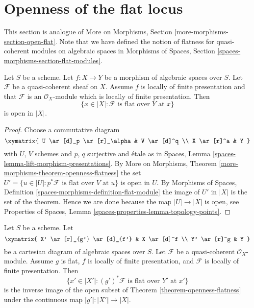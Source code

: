 \section{Openness of the flat locus}
\label{section-open-flat}

\noindent
This section is analogue of
More on Morphisms, Section \ref{more-morphisms-section-open-flat}.
Note that we have defined the notion of flatness for quasi-coherent
modules on algebraic spaces in
Morphisms of Spaces, Section \ref{spaces-morphisms-section-flat-modules}.

\begin{theorem}
\label{theorem-openness-flatness}
Let $S$ be a scheme.
Let $f : X \to Y$ be a morphism of algebraic spaces over $S$.
Let $\mathcal{F}$ be a quasi-coherent sheaf on $X$.
Assume $f$ is locally of finite presentation and that
$\mathcal{F}$ is an $\mathcal{O}_X$-module which is
locally of finite presentation. Then
$$
\{x \in |X| : \mathcal{F}\text{ is flat over }Y\text{ at }x\}
$$
is open in $|X|$.
\end{theorem}

\begin{proof}
Choose a commutative diagram
$$
\xymatrix{
U \ar[d]_p \ar[r]_\alpha &
V \ar[d]^q \\
X \ar[r]^a & Y
}
$$
with $U$, $V$ schemes and $p$, $q$ surjective and \'etale as in
Spaces, Lemma \ref{spaces-lemma-lift-morphism-presentations}.
By
More on Morphisms, Theorem \ref{more-morphisms-theorem-openness-flatness}
the set
$U' = \{u \in |U| : p^*\mathcal{F}\text{ is flat over }V\text{ at }u\}$
is open in $U$. By
Morphisms of Spaces, Definition \ref{spaces-morphisms-definition-flat-module}
the image of $U'$ in $|X|$ is the set
of the theorem. Hence we are done because the map $|U| \to |X|$ is
open, see
Properties of Spaces, Lemma \ref{spaces-properties-lemma-topology-points}.
\end{proof}

\begin{lemma}
\label{lemma-flat-locus-base-change}
Let $S$ be a scheme. Let
$$
\xymatrix{
X' \ar[r]_{g'} \ar[d]_{f'} & X \ar[d]^f \\
Y' \ar[r]^g & Y
}
$$
be a cartesian diagram of algebraic spaces over $S$.
Let $\mathcal{F}$ be a quasi-coherent $\mathcal{O}_X$-module.
Assume $g$ is flat, $f$ is locally of finite presentation,
and $\mathcal{F}$ is locally of finite presentation.
Then
$$
\{x' \in |X'| : (g')^*\mathcal{F}\text{ is flat over }Y'\text{ at }x'\}
$$
is the inverse image of the open subset of
Theorem \ref{theorem-openness-flatness}
under the continuous map $|g'| : |X'| \to |X|$.
\end{lemma}

